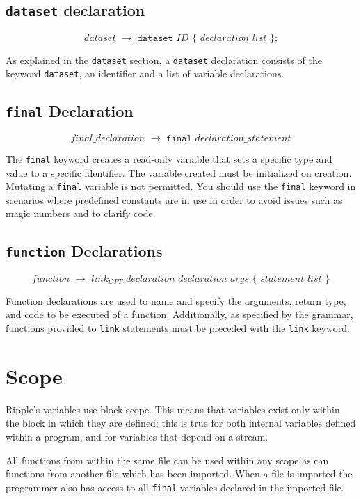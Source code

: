 \documentclass{article}
\newcommand{\code}{\texttt}
\begin{document}
\subsection{\code{dataset} declaration}
\[ dataset\,\,\rightarrow\,\,\code{dataset}\,\,ID\,\,\code{\{}\,\,declaration\_list\,\,\code{\}}\code{;} \]

As explained in the \code{dataset} section, a \code{dataset} declaration consists of the keyword \code{dataset}, an identifier and a list of variable declarations.

\subsection{\code{final} Declaration}
\[ final\_declaration\,\,\rightarrow\,\,\code{final}\,\,declaration\_statement \]

The \code{final} keyword creates a read-only variable that sets a specific type and value to a specific identifier. The variable created must be initialized on creation. Mutating a \code{final} variable is not permitted. You should use the \code{final} keyword in scenarios where predefined constants are in use in order to avoid issues such as magic numbers and to clarify code.

\subsection{\code{function} Declarations}
\[ function\,\,\rightarrow\,\,link_{OPT}\,\,declaration\,\,declaration\_args\,\,\code{\{}\,\,statement\_list\,\,\code{\}} \]

Function declarations are used to name and specify the arguments, return type, and code to be executed of a function. Additionally, as specified by the grammar, functions provided to \code{link} statements must be preceded with the \code{link} keyword.

\section{Scope}
Ripple's variables use block scope. This means that variables exist only within the block in which they are defined; this is true for both internal variables defined within a program, and for variables that depend on a stream.

All functions from within the same file can be used within any scope as can functions from another file which has been imported. When a file is imported the programmer also has access to all \code{final} variables declared in the imported file.
\end{document}
